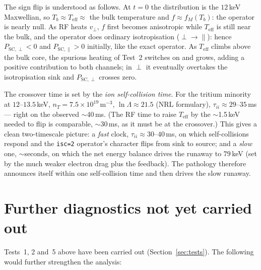 \documentclass[11pt,a4paper]{article}
\begin{document}
The sign flip is understood as follows. At $t=0$ the distribution is the
$12$\,keV Maxwellian, so $T_b\approx T_\text{eff}\approx$ the bulk temperature
and $f\approx f_M(T_b)$: the operator is nearly null. As RF heats $v_\perp$, $f$
first becomes anisotropic while $T_\text{eff}$ is still near the bulk, and the
operator does ordinary isotropisation ($\perp\!\to\!\parallel$): hence
$P_{\mathrm{SC},\perp}<0$ and $P_{\mathrm{SC},\parallel}>0$ initially, like the
exact operator. As $T_\text{eff}$ climbs above the bulk core, the spurious
heating of Test~2 switches on and grows, adding a positive contribution to
both channels; in $\perp$ it eventually overtakes the isotropisation sink and
$P_{\mathrm{SC},\perp}$ crosses zero.

The crossover time is set by the \emph{ion self-collision time}. For the
tritium minority at $12$--$13.5$\,keV, $n_T = 7.5\times10^{19}$\,m$^{-3}$,
$\ln\Lambda\approx21.5$ (NRL formulary),
$\tau_{ii}\approx 29$--$35$\,ms --- right on the observed $\sim$40\,ms. (The RF
time to raise $T_\text{eff}$ by the $\sim$1.5\,keV needed to flip is comparable,
$\sim$30\,ms, as it must be at the crossover.) This gives a clean two-timescale
picture: a \emph{fast} clock, $\tau_{ii}\approx 30$--$40$\,ms, on which
self-collisions respond and the \texttt{isc=2} operator's character flips from
sink to source; and a \emph{slow} one, $\sim$seconds, on which the net energy
balance drives the runaway to $79$\,keV (set by the much weaker electron drag
plus the feedback). The pathology therefore announces itself within one
self-collision time and then drives the slow runaway.

\section{Further diagnostics not yet carried out}

Tests~1, 2 and~5 above have been carried out (Section~\ref{sec:tests}). The
following would further strengthen the analysis:
\end{document}
